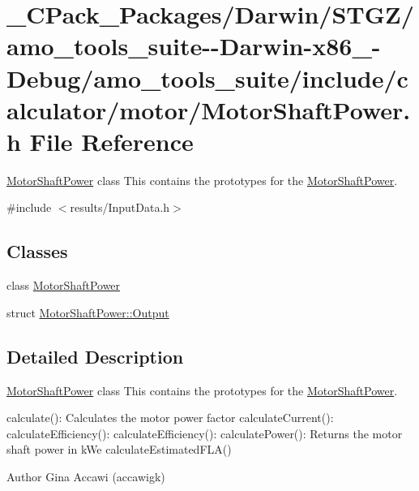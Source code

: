 \hypertarget{___c_pack___packages_2_darwin_2_s_t_g_z_2amo__tools__suite--_darwin-x86__64-_debug_2amo__tools__2881b0c637e0a7724aa4b2570e6e46e8}{}\section{\+\_\+\+C\+Pack\+\_\+\+Packages/\+Darwin/\+S\+T\+G\+Z/amo\+\_\+tools\+\_\+suite-\/-\/\+Darwin-\/x86\+\_-\/\+Debug/amo\+\_\+tools\+\_\+suite/include/calculator/motor/\+Motor\+Shaft\+Power.h File Reference}
\label{___c_pack___packages_2_darwin_2_s_t_g_z_2amo__tools__suite--_darwin-x86__64-_debug_2amo__tools__2881b0c637e0a7724aa4b2570e6e46e8}


\hyperlink{class_motor_shaft_power}{Motor\+Shaft\+Power} class This contains the prototypes for the \hyperlink{class_motor_shaft_power}{Motor\+Shaft\+Power}.  


{\ttfamily \#include $<$results/\+Input\+Data.\+h$>$}\newline
\subsection*{Classes}
\begin{DoxyCompactItemize}
\item 
class \hyperlink{class_motor_shaft_power}{Motor\+Shaft\+Power}
\item 
struct \hyperlink{struct_motor_shaft_power_1_1_output}{Motor\+Shaft\+Power\+::\+Output}
\end{DoxyCompactItemize}


\subsection{Detailed Description}
\hyperlink{class_motor_shaft_power}{Motor\+Shaft\+Power} class This contains the prototypes for the \hyperlink{class_motor_shaft_power}{Motor\+Shaft\+Power}. 

calculate()\+: Calculates the motor power factor calculate\+Current()\+: calculate\+Efficiency()\+: calculate\+Efficiency()\+: calculate\+Power()\+: Returns the motor shaft power in k\+We calculate\+Estimated\+F\+L\+A()

\begin{DoxyAuthor}{Author}
Gina Accawi (accawigk) 
\end{DoxyAuthor}
